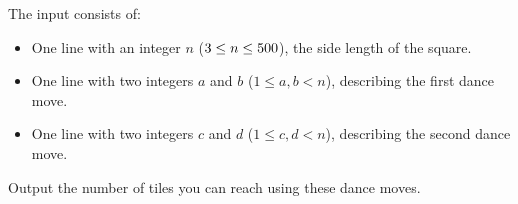 \begin{Input}
  The input consists of:
  \begin{itemize}
    \item One line with an integer $n$ ($3\leq n\leq 500$), the side length of the square.
    \item One line with two integers $a$ and $b$ ($1\leq a, b < n$), describing the first dance move.
    \item One line with two integers $c$ and $d$ ($1\leq c, d < n$), describing the second dance move.
  \end{itemize}
\end{Input}

\begin{Output}
  Output the number of tiles you can reach using these dance moves.
\end{Output}
